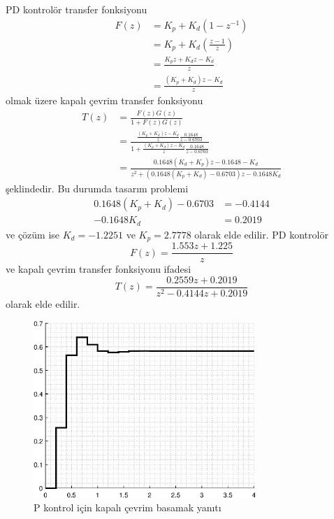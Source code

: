 PD kontrolör transfer fonksiyonu
\begin{equation}
\begin{split}
    F(z)&=K_p+K_d(1-z^{-1})\\
    &=K_p+K_d(\frac{z-1}{z})\\
    &=\frac{K_pz+K_dz-K_d}{z}\\
    &=\frac{(K_p+K_d)z-K_d}{z}
\end{split}
\end{equation}
olmak üzere kapalı çevrim transfer fonksiyonu
\begin{equation}
    \begin{split}
        T(z)&=\frac{F(z)G(z)}{1+F(z)G(z)}\\
        &=\frac{\frac{(K_p+K_d)z-K_d}{z}\frac{0.1648}{z-0.6703}}{1+\frac{(K_p+K_d)z-K_d}{z}\frac{0.1648}{z-0.6703}}\\
        &=\frac{0.1648(K_d+K_p)z-0.1648-K_d}{z^2+(0.1648(K_p+K_d)-0.6703)z-0.1648K_d}
    \end{split}
\end{equation}
şeklindedir. Bu durumda tasarım problemi
\begin{equation}
    \begin{split}
        0.1648(K_p+K_d)-0.6703&=-0.4144\\
        -0.1648K_d&=0.2019
    \end{split}
\end{equation}
ve çözüm ise $K_d=-1.2251$ ve $K_p=2.7778$ olarak elde edilir. PD kontrolör
\begin{equation}
    F(z)=\frac{1.553 z + 1.225}{z}
\end{equation}
ve kapalı çevrim transfer fonksiyonu ifadesi
\begin{equation}
    T(z)=\frac{0.2559 z + 0.2019}{z^2 - 0.4144 z + 0.2019}
\end{equation}
olarak elde edilir.
\begin{figure}[!htb]
    \centering
    \includegraphics[width=0.75\textwidth]{img/lec6_step2}
    \caption{P kontrol için kapalı çevrim basamak yanıtı}
    \label{fig:lec6_step2}
\end{figure}

